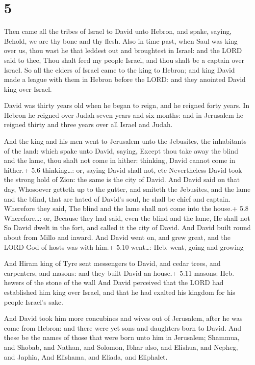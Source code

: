 \hypertarget{section-4}{%
\section{5}\label{section-4}}

 Then came all the tribes of Israel to David unto Hebron,
and spake, saying, Behold, we are thy bone and thy flesh. 
Also in time past, when Saul was king over us, thou wast he that leddest
out and broughtest in Israel: and the LORD said to thee, Thou shalt feed
my people Israel, and thou shalt be a captain over Israel. 
So all the elders of Israel came to the king to Hebron; and king David
made a league with them in Hebron before the LORD: and they anointed
David king over Israel.

 David was thirty years old when he began to reign, and he
reigned forty years.  In Hebron he reigned over Judah seven
years and six months: and in Jerusalem he reigned thirty and three years
over all Israel and Judah.

 And the king and his men went to Jerusalem unto the
Jebusites, the inhabitants of the land: which spake unto David, saying,
Except thou take away the blind and the lame, thou shalt not come in
hither: thinking, David cannot come in hither.+ 5.6 thinking\ldots: or,
saying David shall not, etc  Nevertheless David took the
strong hold of Zion: the same is the city of David.  And
David said on that day, Whosoever getteth up to the gutter, and smiteth
the Jebusites, and the lame and the blind, that are hated of David's
soul, he shall be chief and captain. Wherefore they said, The blind and
the lame shall not come into the house.+ 5.8 Wherefore\ldots: or,
Because they had said, even the blind and the lame, He shall not
 So David dwelt in the fort, and called it the city of
David. And David built round about from Millo and inward. 
And David went on, and grew great, and the LORD God of hosts was with
him.+ 5.10 went\ldots: Heb. went, going and growing

 And Hiram king of Tyre sent messengers to David, and
cedar trees, and carpenters, and masons: and they built David an house.+
5.11 masons: Heb. hewers of the stone of the wall  And
David perceived that the LORD had established him king over Israel, and
that he had exalted his kingdom for his people Israel's sake.

 And David took him more concubines and wives out of
Jerusalem, after he was come from Hebron: and there were yet sons and
daughters born to David.  And these be the names of those
that were born unto him in Jerusalem; Shammua, and Shobab, and Nathan,
and Solomon,  Ibhar also, and Elishua, and Nepheg, and
Japhia,  And Elishama, and Eliada, and Eliphalet.

